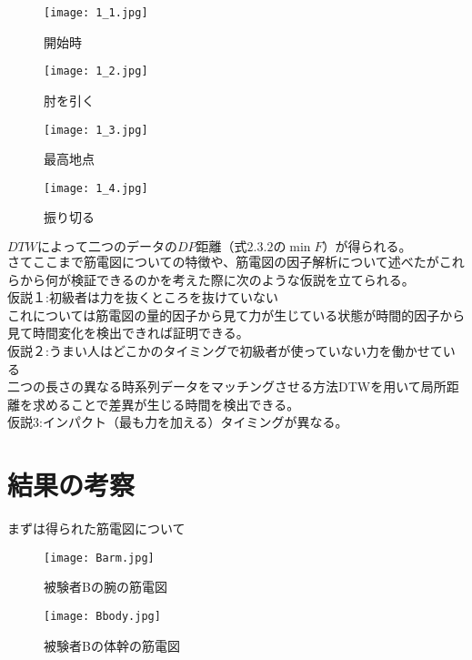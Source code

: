\documentclass[11pt,a4j,notitlepage]{jreport}
\begin{document}
\begin{figure}[htbp]
\begin{minipage}{0.22\hsize}

\texttt{[image: 1\_1.jpg]}
\caption{開始時}

\end{minipage}
\begin{minipage}{0.22\hsize}

\texttt{[image: 1\_2.jpg]}
\caption{肘を引く}

\end{minipage}
\begin{minipage}{0.22\hsize}

\texttt{[image: 1\_3.jpg]}
\caption{最高地点}

\end{minipage}
\begin{minipage}{0.22\hsize}

\texttt{[image: 1\_4.jpg]}
\caption{振り切る}

\end{minipage}
\end{figure}
$DTWによって二つのデータのDP距離（式2.3.2の\min F）が得られる。$
\\
さてここまで筋電図についての特徴や、筋電図の因子解析について述べたがこれらから何が検証できるのかを考えた際に次のような仮説を立てられる。\\
仮説１:初級者は力を抜くところを抜けていない\\
これについては筋電図の量的因子から見て力が生じている状態が時間的因子から見て時間変化を検出できれば証明できる。\\
仮説２:うまい人はどこかのタイミングで初級者が使っていない力を働かせている\\
二つの長さの異なる時系列データをマッチングさせる方法DTWを用いて局所距離を求めることで差異が生じる時間を検出できる。\\
仮説3:インパクト（最も力を加える）タイミングが異なる。


\section{結果の考察}
まずは得られた筋電図について
\begin{figure}[htbp]

\begin{center}

\texttt{[image: Barm.jpg]}
\caption{被験者Bの腕の筋電図}
\end{center}

\begin{center}
\texttt{[image: Bbody.jpg]}
\caption{被験者Bの体幹の筋電図}

\end{center}

\end{figure}
\end{document}
